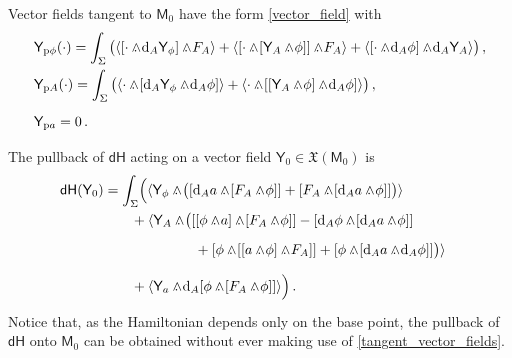 \documentclass[12pt]{amsart}
\theoremstyle{plain}
\theoremstyle{definition}
\theoremstyle{remark}
\newcommand{\wed}{\wedge\hspace*{-7.5pt}.\hspace*{3pt}}
\numberwithin{equation}{section}  %
\begin{document}
Vector fields tangent to $\mathsf{M}_0$ have the form \eqref{vector_field} with
\begin{align}\label{tangent_vector_fields}
\begin{split}
  & \mathsf{Y}_{\mathrm{p} \phi}(\cdot)=\int_\Sigma\big(\langle[\cdot\wed \mathrm{d}_A \mathsf{Y}_\phi]\wed F_A\rangle+\langle[\cdot\wed[\mathsf{Y}_A\wed \phi]]\wed F_A\rangle+\langle[\cdot\wed \mathrm{d}_A\phi]\wed \mathrm{d}_A  \mathsf{Y}_A\rangle\big)\,, \\
  & \mathsf{Y}_{\mathrm{p} A}(\cdot)=\int_\Sigma \big(\langle\cdot\wed [\mathrm{d}_A \mathsf{Y}_\phi\wed \mathrm{d}_A \phi]\rangle+\langle\cdot\wed [[\mathsf{Y}_A\wed \phi]\wed \mathrm{d}_A\phi] \rangle\big)\,, \\
  & \mathsf{Y}_{\mathrm{p} a}=0\,.\phantom{\int}
\end{split}
\end{align}
The pullback of $\mathsf{d H}$ acting on a vector field $\mathsf{Y}_0\in\mathfrak{X}(\mathsf{M}_0)$ is
\begin{align*}
\begin{split}
 \mathsf{d H}(\mathsf{Y}_0)=\int_\Sigma&\Big(\langle \mathsf{Y}_\phi\wed\big([\mathrm{d}_A a\wed[F_A\wed\phi]]+[F_A\wed[\mathrm{d}_A a \wed\phi]]\big)\rangle\\
&\hspace*{-2mm}+\langle \mathsf{Y}_A\wed\big([[\phi\wed a]\wed[F_A\wed \phi]]-[\mathrm{d}_A\phi\wed[\mathrm{d}_A a \wed \phi]]\\
 &\hspace*{1.4cm}+[\phi\wed[[a\wed\phi]\wed F_A]]+[\phi\wed[\mathrm{d}_A a\wed \mathrm{d}_A\phi]]\big)\rangle\phantom{\int}\\
&\hspace*{-2mm}+\langle \mathsf{Y}_{a}\wed \mathrm{d}_A[\phi\wed[F_A\wed \phi]]\rangle\Big)\,.\phantom{\int}
\end{split}
\end{align*}
Notice that, as the Hamiltonian depends only on the base point, the pullback of $\mathsf{d H}$ onto $\mathsf{M}_0$ can be obtained without ever making use of \eqref{tangent_vector_fields}.
\end{document}
